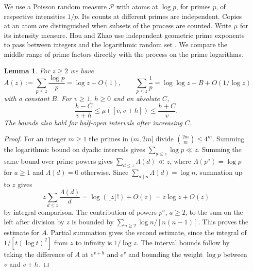 \documentclass[11pt]{article}
\newtheorem{lemma}[theorem]{Lemma}
\numberwithin{equation}{section}
\begin{document}
We use a Poisson random measure $\mathcal P$ with atoms at $\log p$,
for primes $p$, of respective intensities $1/p$. Its counts at
different primes are independent. Copies at an atom are distinguished
when subsets of the process are counted. Write $\mu$ for its intensity
measure. Hou and Zhao use independent geometric prime exponents to
pass between integers and the logarithmic random set
\cite[Section~3]{hz}. We compare the middle range of prime factors
directly with the process on the prime logarithms.

\begin{lemma}\label{l:prime-log-measure}
For $z\ge2$ we have
\[
 A(z):=\sum_{p\le z}\frac{\log p}{p}=\log z+O(1),\qquad
 \sum_{p\le z}\frac1p=\log\log z+B+O(1/\log z)
\]
with a constant $B$. For $v\ge1$, $h\ge0$ and an absolute $C$,
\[
 \frac{h-C}{v+h}\le\mu([v,v+h])\le\frac{h+C}{v}.
\]
The bounds also hold for half-open intervals after increasing $C$.
\end{lemma}
\begin{proof}
For an integer $m\ge1$ the primes in $(m,2m]$ divide
$\binom{2m}{m}\le4^m$. Summing the logarithmic bound on dyadic
intervals gives $\sum_{p\le z}\log p\ll z$. Summing the same bound
over prime powers gives $\sum_{d\le z}\Lambda(d)\ll z$, where
$\Lambda(p^a)=\log p$ for $a\ge1$ and $\Lambda(d)=0$ otherwise.
Since $\sum_{d\mid n}\Lambda(d)=\log n$, summation up to $z$ gives
\[
 z\sum_{d\le z}\frac{\Lambda(d)}{d}
 =\log(\lfloor z\rfloor!)+O(z)=z\log z+O(z)
\]
by integral comparison. The contribution of powers $p^a$, $a\ge2$,
to the sum on the left after division by $z$ is bounded by
$\sum_{n\ge2}\log n/[n(n-1)]$. This proves the estimate for $A$.
Partial summation gives the second estimate, since the integral of
$1/[t(\log t)^2]$ from $z$ to infinity is $1/\log z$. The interval
bounds follow by taking the difference of $A$ at $e^{v+h}$ and $e^v$
and bounding the weight $\log p$ between $v$ and $v+h$.
\end{proof}
\end{document}
